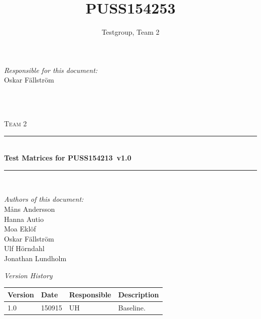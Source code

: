 \documentclass[a4paper]{article}
\title{PUSS154253}
\author{Testgroup, Team 2}
\newcommand{\SVVS}{PUSS154213}
\begin{document}
\begin{titlepage}
\newcommand{\HRule}{\rule{\linewidth}{0.5mm}}

\begin{minipage}{0.5\textwidth}
\begin{flushleft} %
\textit{Responsible for this document:}\\
Oskar Fällström %
\end{flushleft}
\end{minipage}
~
\begin{minipage}{0.4\textwidth}
\begin{flushright}
\title  %
\today
\end{flushright}
\end{minipage}\\[3cm]

\centering
\textsc{\LARGE Team 2}\\[0.5cm]

\HRule \\[0.4cm]
{ \huge \bfseries Test Matrices for \SVVS\ v1.0 }\\[0.4cm] %
\HRule \\[1.5cm]

\vfill
\begin{flushleft}
\textit{Authors of this document:}\\
Måns Andersson \\
Hanna Autio \\
Moa Eklöf \\
Oskar Fällström \\
Ulf Hörndahl \\
Jonathan Lundholm
\end{flushleft}


\end{titlepage}

\begin{center}
\textit{\large Version History}

    \begin{tabular}{ | l | l | l | p{5cm} |}
    \hline
    \textbf{Version} 	& \textbf{Date} 	& \textbf{Responsible} 	& \textbf{Description} 		\\ \hline
    1.0				 	& 150915 			& UH 					&  Baseline. 				\\ \hline
    \end{tabular}
\end{center}
\end{document}

